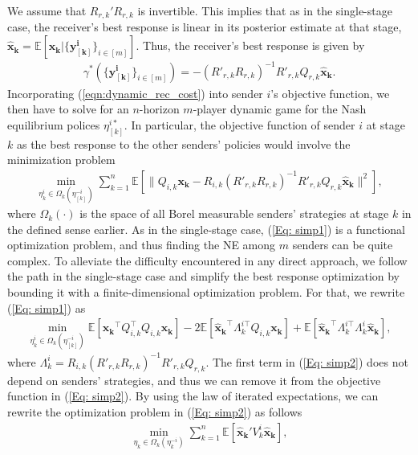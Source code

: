\documentclass[12pt,journal,onecolumn]{IEEEtran}
\begin{document}
We assume that $R_{r,k}'R_{r,k}$ is invertible. This implies that as in the single-stage case, the receiver's best response is linear in its posterior estimate at that stage, $\boldsymbol{\hat{x}_k}=\mathbb{E}[\boldsymbol{x_k}|\{\boldsymbol{y^i_{[k]}}\}_{i\in[m]}]$. Thus, the receiver's best response is given by
\begin{align}\label{eqn:dynamic_rec_cost}
    \gamma^*(\{\boldsymbol{y^i_{[k]}}\}_{i\in[m]})=-(R'_{r,k}R_{r,k})^{-1}R'_{r,k}Q_{r,k}\boldsymbol{\hat{x}_k}.
\end{align}
Incorporating (\ref{eqn:dynamic_rec_cost}) into sender $i$'s objective function, we then have to solve for an $n$-horizon $m$-player dynamic game for the Nash equilibrium polices $\eta_{[k]}^{i*}$. In particular, the objective function of sender $i$ at stage $k$ as the best response to the other senders' policies would involve the minimization problem
\begin{align}\label{Eq: simp1}
    \min_{\eta^i_k\in\Omega_k(\eta^{-i}_{[k]})}\sum_{k=1}^n\mathbb{E}[\|Q_{i,k}\boldsymbol{x_k}-R_{i,k}(R'_{r,k}R_{r,k})^{-1}R'_{r,k}Q_{r,k}\boldsymbol{\hat{x}_k}\|^2],
\end{align}
where $\Omega_{k}(\cdot)$ is the space of all Borel measurable senders' strategies at stage $k$ in the defined sense earlier. As in the single-stage case, (\ref{Eq: simp1}) is a functional optimization problem, and thus finding the NE among $m$ senders can be quite complex. To alleviate the difficulty encountered in any direct approach, we follow the path in the single-stage case and simplify the best response optimization by bounding it with a finite-dimensional optimization problem. For that, we rewrite (\ref{Eq: simp1}) as
\begin{align}\label{Eq: simp2}
\min_{\eta^i_k\in\Omega_k(\eta^{-i}_{[k]})}\mathbb{E}[\boldsymbol{x_k}^\top Q_{i,k}^\top Q_{i,k}\boldsymbol{x_k}]-2\mathbb{E}[\boldsymbol{\hat{x}_k}^\top\Lambda_k^{i\top}Q_{i,k}\boldsymbol{x_k}]+\mathbb{E}[\boldsymbol{\hat{x}_k}^\top\Lambda_k^{i\top}\Lambda_k^i\boldsymbol{\hat{x}_k}], 
\end{align}
where $\Lambda_k^i=R_{i,k}(R'_{r,k}R_{r,k})^{-1}R'_{r,k}Q_{r,k}$. The first term in (\ref{Eq: simp2}) does not depend on senders' strategies, and thus we can remove it from the objective function in (\ref{Eq: simp2}). By using the law of iterated expectations, we can rewrite the optimization problem in (\ref{Eq: simp2}) as follows
\begin{align}\label{eq: bestrespdynamic}
    \min_{\eta_k\in\Omega_k(\eta^{-i}_k)}\sum_{k=1}^n\mathbb{E}[\boldsymbol{\hat{x}_k}'V_k^i\boldsymbol{\hat{x}_k}],
\end{align}
\end{document}
